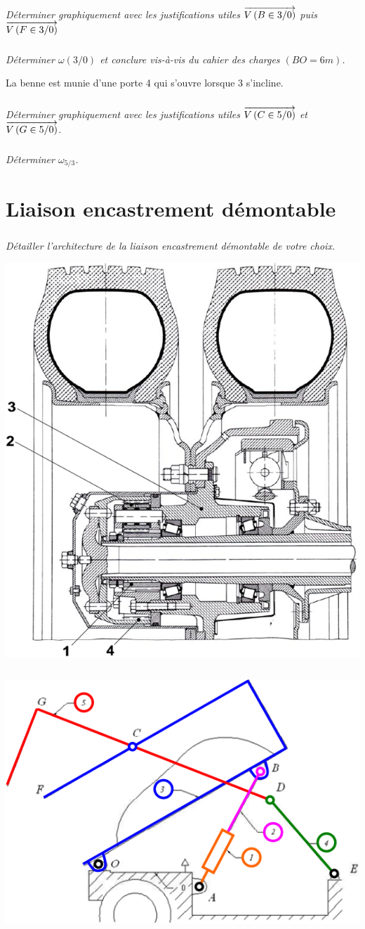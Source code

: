 \documentclass[10pt,fleqn]{article} %
\begin{document}
\begin{multicols}{2}
\subparagraph{}
\textit{Déterminer graphiquement avec les justifications utiles $\overrightarrow{V\left( {B} \in {3}/{0}\right)}$ puis $\overrightarrow{V\left( {F} \in {3}/{0}\right)}$}


\subparagraph{}
\textit{Déterminer $\omega(3/0)$ et conclure vis-à-vis du cahier des charges $(BO=6m)$.}

La benne est munie d'une porte 4 qui s'ouvre lorsque 3 s'incline.


\subparagraph{}
\textit{Déterminer graphiquement avec les justifications utiles $\overrightarrow{V\left( {C} \in {5}/{0}\right)}$ et $\overrightarrow{V\left( {G} \in {5}/{0}\right)}$.}


\subparagraph{}
\textit{Déterminer $\omega_{5/3}$.}





\section*{Liaison encastrement démontable}
\setcounter{exo}{0}

\subparagraph{}
\textit{Détailler l'architecture de la liaison encastrement démontable de votre choix.}


\end{multicols}
\begin{center}
\includegraphics[width=.6\linewidth]{Dessin_02}
\end{center}
\newpage
$$ \quad $$
\vspace{6cm}

\begin{center}
\includegraphics[width=.75\textwidth]{images/fig4}
\end{center}


\end{document}
